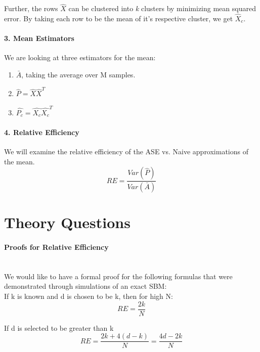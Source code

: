 \documentclass[10pt]{article}
\begin{document}
	Further, the rows $\hat{X}$ can be clustered into \textit{k} clusters by minimizing mean squared error.  By taking each row to be the mean of it's respective cluster, we get $\hat{X}_c$.
	
	\paragraph{3. Mean Estimators}  We are looking at three estimators for the mean:
	\begin{enumerate}
		\item $\bar{A}$, taking the average over M samples.
		\item $\hat{P} = \hat{X}\hat{X}^T$
		\item $\hat{P_c} = \hat{X_c}\hat{X_c}^T$
	\end{enumerate}

\paragraph{4. Relative Efficiency} We will examine the relative efficiency of the ASE vs. Naive approximations of the mean.
\begin{equation*}
RE = \dfrac{Var(\hat{P})}{Var(\bar{A})}
\end{equation*}

\section{Theory Questions}
\paragraph{Proofs for Relative Efficiency} \mbox{}\\
We would like to have a formal proof for the following formulas that were demonstrated through simulations of an exact SBM:\\

If k is known and d is chosen to be k, then for high N:
\[
RE = \dfrac{2k}{N}
\]

If d is selected to be greater than k
\[
RE = \dfrac{2k+4(d-k)}{N} = \dfrac{4d-2k}{N}
\]
\end{document}
